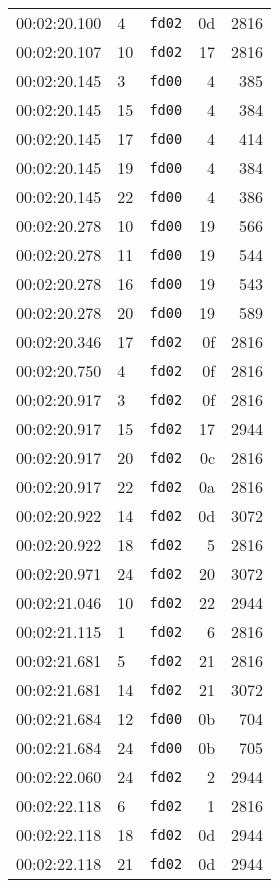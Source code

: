 \documentclass{article}
\begin{document}
\begin{longtable}{lllrr}
00:02:20.100 & 4 & \texttt{fd02} & 0d & 2816 \\
00:02:20.107 & 10 & \texttt{fd02} & 17 & 2816 \\
00:02:20.145 & 3 & \texttt{fd00} & 4 & 385 \\
00:02:20.145 & 15 & \texttt{fd00} & 4 & 384 \\
00:02:20.145 & 17 & \texttt{fd00} & 4 & 414 \\
00:02:20.145 & 19 & \texttt{fd00} & 4 & 384 \\
00:02:20.145 & 22 & \texttt{fd00} & 4 & 386 \\
00:02:20.278 & 10 & \texttt{fd00} & 19 & 566 \\
00:02:20.278 & 11 & \texttt{fd00} & 19 & 544 \\
00:02:20.278 & 16 & \texttt{fd00} & 19 & 543 \\
00:02:20.278 & 20 & \texttt{fd00} & 19 & 589 \\
00:02:20.346 & 17 & \texttt{fd02} & 0f & 2816 \\
00:02:20.750 & 4 & \texttt{fd02} & 0f & 2816 \\
00:02:20.917 & 3 & \texttt{fd02} & 0f & 2816 \\
00:02:20.917 & 15 & \texttt{fd02} & 17 & 2944 \\
00:02:20.917 & 20 & \texttt{fd02} & 0c & 2816 \\
00:02:20.917 & 22 & \texttt{fd02} & 0a & 2816 \\
00:02:20.922 & 14 & \texttt{fd02} & 0d & 3072 \\
00:02:20.922 & 18 & \texttt{fd02} & 5 & 2816 \\
00:02:20.971 & 24 & \texttt{fd02} & 20 & 3072 \\
00:02:21.046 & 10 & \texttt{fd02} & 22 & 2944 \\
00:02:21.115 & 1 & \texttt{fd02} & 6 & 2816 \\
00:02:21.681 & 5 & \texttt{fd02} & 21 & 2816 \\
00:02:21.681 & 14 & \texttt{fd02} & 21 & 3072 \\
00:02:21.684 & 12 & \texttt{fd00} & 0b & 704 \\
00:02:21.684 & 24 & \texttt{fd00} & 0b & 705 \\
00:02:22.060 & 24 & \texttt{fd02} & 2 & 2944 \\
00:02:22.118 & 6 & \texttt{fd02} & 1 & 2816 \\
00:02:22.118 & 18 & \texttt{fd02} & 0d & 2944 \\
00:02:22.118 & 21 & \texttt{fd02} & 0d & 2944 \\

\end{longtable}
\end{document}
